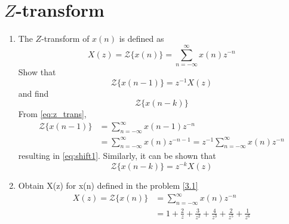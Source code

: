 \documentclass[journal,12pt,twocolumn]{IEEEtran}
\renewcommand\thesection{\arabic{section}}
\begin{document}
\section{$Z$-transform}
\begin{enumerate}[label=\thesection.\arabic*]
\item The $Z$-transform of $x(n)$ is defined as
%
\begin{equation}
	\label{eq:z_trans}
	X(z)={\mathcal {Z}}\{x(n)\}=\sum _{n=-\infty }^{\infty }x(n)z^{-n}
\end{equation}
%
Show that
\begin{equation}
	\label{eq:shift1}
	{\mathcal {Z}}\{x(n-1)\} = z^{-1}X(z)
\end{equation}
and find
\begin{equation}
	{\mathcal {Z}}\{x(n-k)\} 
\end{equation}
\solution From \eqref{eq:z_trans},
\begin{align}
	{\mathcal {Z}}\{x(n-1)\} &=\sum _{n=-\infty }^{\infty }x(n-1)z^{-n}
	\\
	&=\sum _{n=-\infty }^{\infty }x(n)z^{-n-1} = z^{-1}\sum _{n=-\infty }^{\infty }x(n)z^{-n}
\end{align}
resulting in \eqref{eq:shift1}. Similarly, it can be shown that
%
\begin{equation}
	\label{eq:z_trans_shift}
	{\mathcal {Z}}\{x(n-k)\} = z^{-k}X(z)
\end{equation}
\item Obtain X(z) for x(n) defined in the problem \ref{3.1}
\solution 
\begin{align}
	\label{eq:z_trans}
X(z)={\mathcal {Z}}\{x(n)\}&=\sum _{n=-\infty }^{\infty }x(n)z^{-n}\\
&=1+\frac{2}{z}+\frac{3}{z^2}+\frac{4}{z^3}+\frac{2}{z^5}+\frac{1}{z^6}\\
\end{align}


\end{enumerate}
\end{document}
